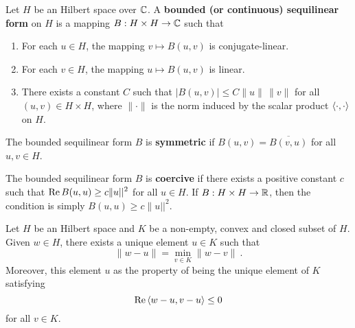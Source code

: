 \begin{defn}
Let $H$ be an Hilbert space over $\mathbb{C}$.  A
{\bfseries bounded (or continuous) sequilinear form}%
on $H$ is a mapping $B:H\times H \rightarrow \mathbb{C}$ such that
\begin{enumerate}
\item For each $u\in H$, the mapping $v \mapsto B(u,v)$ is conjugate-linear.
\item For each $v\in H$, the mapping $u \mapsto B(u,v)$ is linear.
\item There exists a constant $C$ such that
$\displaystyle \left| B(u,v) \right| \leq C \| u\| \, \| v\|$
for all $\displaystyle (u,v) \in H \times H$, where $\|\cdot\|$ is the
norm induced by the scalar product $\left\langle{\cdot} , {\cdot}\right\rangle$ on $H$.
\end{enumerate}

The bounded sequilinear form $B$ is
{\bfseries symmetric} if
$\displaystyle B(u,v) = \overline{B(v,u)}$ for all $u,v \in H$.

The bounded sequilinear form $B$ is
{\bfseries coercive} if there
exists a positive constant $c$ such that
$\displaystyle \operatorname{Re} B(u,u) \geq c \|u||^2$ for all $u \in H$.  If
$B:H\times H \rightarrow \mathbb{R}$, then the condition is simply
$\displaystyle B(u,u) \geq c \|u||^2$.
\end{defn}

\begin{prop} \label{fu_an_pre_lax}
Let $H$ be an Hilbert space and $K$ be a non-empty, convex and
closed subset of $H$.  Given $w\in H$, there exists a unique element
$u \in K$ such that
\begin{equation} \label{fu_an_lax3}
\| w-u\| = \min_{v\in K} \|w-v\| \ .
\end{equation}
Moreover, this element $u$ as the property of being the unique element
of $K$ satisfying
\begin{equation} \label{fu_an_lax4}
\operatorname{Re} \left\langle{w-u} , {v-u}\right\rangle \leq 0
\end{equation}
for all $v \in K$.
\end{prop}

